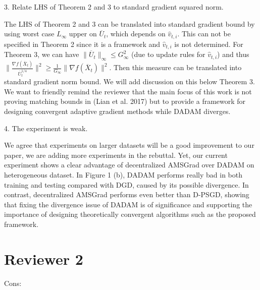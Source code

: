 \documentclass{article} %
\begin{document}
3. Relate LHS of Theorem 2 and 3 to standard gradient squared norm.

The LHS of Theorem 2 and 3 can be translated into standard gradient bound by using worst case $L_{\infty}$ upper on $\overline U_{t}$, which depends on $\hat {v}_{t,i}$. This can not be specified in Theorem 2 since it is a framework and $\hat {v}_{t,i}$ is not determined. For Theorem 3, we can have $\|\overline U_{t}\|_{\infty} \leq G_{\infty}^2$ (due to update rules for $\hat {v}_{t,i}$) and thus $\|\frac{\nabla f(\overline X_t)}{\overline U_t^{1/4}}\|^2 \geq \frac{1}{G_{\infty}}\|{\nabla f(\overline X_t)}\|^2$. Then this measure can be translated into standard gradient norm bound. We will add discussion on this below Theorem 3. We want to friendly remind the reviewer that the main focus of this work is not proving matching bounds in (Lian et al. 2017) but to provide a framework for designing convergent adaptive gradient methods while DADAM diverges.


4. The experiment is weak.

We agree that experiments on larger datasets will be a good improvement to our paper, we are adding more experiments in the rebuttal. 
Yet, our current experiment shows a clear advantage of decentralized AMSGrad over DADAM on heterogeneous dataset. In Figure 1 (b), DADAM performs really bad in both training and testing compared with DGD, caused by its possible divergence. In contrast, decentralized AMSGrad performs even better than D-PSGD, showing that fixing the divergence issue of DADAM is of significance and supporting the importance of designing theoretically convergent algorithms such as the proposed framework.


\section{Reviewer 2}
\vspace{-0.1in}

Cons:
\end{document}
